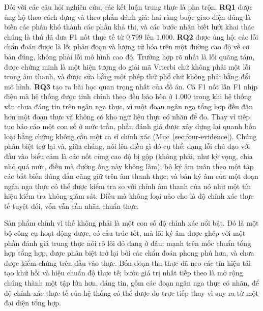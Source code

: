 \documentclass[12pt,a4paper]{article}
\begin{document}
Đối với các câu hỏi nghiên cứu, các kết luận trung thực là pha trộn. \textbf{RQ1}
được ủng hộ theo cách dựng và theo phần đánh giá: hai ràng buộc giao diện đúng là
biến các phần khó thành các phần khả thi, và các bước nhận biết lưới khai thác chúng
là thứ đã đưa F1 nốt thực tế từ $0.799$ lên $1.000$. \textbf{RQ2} được ủng hộ: các
lỗi chẩn đoán được là lỗi phân đoạn và lượng tử hóa trên một đường cao độ về cơ bản
đúng, không phải lỗi mô hình cao độ. Trường hợp rõ nhất là lỗi quãng tám, được chứng
minh là một hiện tượng do giải mã Viterbi chứ không phải một lỗi trong âm thanh, và
được sửa bằng một phép thử phổ chứ không phải bằng đổi mô hình. \textbf{RQ3} tạo ra
bài học quan trọng nhất của đồ án. Cả F1 nốt lẫn F1 nhịp điệu mà hệ thống được tinh
chỉnh theo đều bão hòa ở $1.000$ trong khi hệ thống vẫn chưa đáng tin trên ngân nga
thực, vì một đoạn ngân nga tổng hợp đều đặn hơn một đoạn thực và không có kho ngữ
liệu thực có nhãn để đo. Thay vì tiếp tục báo cáo một con số ở mức trần, phần đánh
giá được xây dựng lại quanh bốn loại bằng chứng không cần một ca sĩ chính xác
(Mục~\ref{sec:four-evidence}). Chúng phân biệt trở lại và, giữa chúng, nói lên điều
gì đó cụ thể: dạng lỗi chủ đạo với đầu vào biểu cảm là các nốt cùng cao độ bị gộp
(không phải, như kỳ vọng, chia nhỏ quá mức, điều mà đường ống này không làm); bộ ký
âm tuân theo một tập các bất biến đúng đắn cũng giữ trên âm thanh thực; và bản ký âm
của một đoạn ngân nga thực có thể được kiểm tra so với chính âm thanh của nó như một
tín hiệu kiểm tra không giám sát. Điều mà không loại nào cho là độ chính xác thực tế
tuyệt đối, vốn vẫn cần nhãn chuẩn thực.

Sản phẩm chính vì thế không phải là một con số độ chính xác nổi bật. Đó là một bộ
công cụ hoạt động được, có cấu trúc tốt, mà lõi ký âm được ghép với một phần đánh giá
trung thực nói rõ lõi đó đang ở đâu: mạnh trên mốc chuẩn tổng hợp tổng hợp, được
phân biệt trở lại bởi các chẩn đoán phong phú hơn, và chưa được kiểm chứng trên đầu
vào thực. Bốn đoạn thu thực đã neo các tín hiệu tái tạo khứ hồi và hiệu chuẩn độ
thực tế; bước giá trị nhất tiếp theo là mở rộng chúng thành một tập lớn hơn, đáng
tin, gồm các đoạn ngân nga thực có nhãn, để độ chính xác thực tế của hệ thống có thể
được đo trực tiếp thay vì suy ra từ một đại diện tổng hợp.
\end{document}
